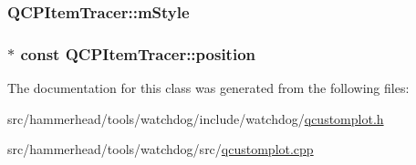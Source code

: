 \subsubsection[{\texorpdfstring{m\+Style}{mStyle}}]{ Q\+C\+P\+Item\+Tracer\+::m\+Style\hspace{0.3cm}{\ttfamily [protected]}}\hypertarget{classQCPItemTracer_afb1f236bebf417544e0138fef22a292e}{}\label{classQCPItemTracer_afb1f236bebf417544e0138fef22a292e}
\subsubsection[{\texorpdfstring{position}{position}}]{$\ast$ const Q\+C\+P\+Item\+Tracer\+::position}\hypertarget{classQCPItemTracer_a69917e2fdb2b3a929c196958feee7cbe}{}\label{classQCPItemTracer_a69917e2fdb2b3a929c196958feee7cbe}


The documentation for this class was generated from the following files\+:\begin{DoxyCompactItemize}
\item 
src/hammerhead/tools/watchdog/include/watchdog/\hyperlink{qcustomplot_8h}{qcustomplot.\+h}\item 
src/hammerhead/tools/watchdog/src/\hyperlink{qcustomplot_8cpp}{qcustomplot.\+cpp}\end{DoxyCompactItemize}
